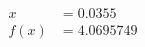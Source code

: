 \documentclass[preview]{standalone}
\begin{document}
\begin{align*}
x &= 0.0355\\f(x) &= 4.0695749
\end{align*}
\end{document}
